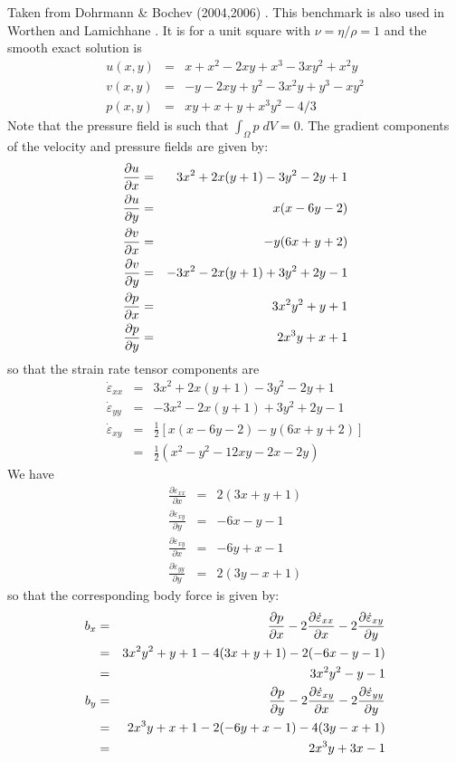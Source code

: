 Taken from Dohrmann \& Bochev (2004,2006) \cite{dobo04,bodg06}. 
This benchmark is also used in Worthen \etal \cite{wosp14} and Lamichhane \etal \cite{lami17}.
It is for a unit square with $\nu=\eta/\rho=1$ and the smooth exact solution is
\begin{eqnarray}
u(x,y) &=& x+x^2 - 2xy+x^3 - 3xy^2 + x^2y \\
v(x,y) &=& -y-2xy+y^2 -3x^2y + y^3 - xy^2 \\
p(x,y) &=& xy+x+y+x^3y^2 - 4/3
\end{eqnarray}
Note that the pressure field is such that $\int_{\Omega} p \; dV = 0$.
The gradient components of the velocity and pressure fields are given by:
\begin{eqnarray}
\frac{\partial u}{\partial x} &=& 3x^2+2x(y+1)-3y^2-2y+1  \nonumber \\
\frac{\partial u}{\partial y} &=& x(x-6y-2) \nonumber\\
\frac{\partial v}{\partial x} &=& -y(6x+y+2) \nonumber\\
\frac{\partial v}{\partial y} &=& -3x^2-2x(y+1)+3y^2+2y-1 \nonumber\\
\frac{\partial p}{\partial x} &=& 3x^2y^2 + y +1 \nonumber\\ 
\frac{\partial p}{\partial y} &=& 2x^3y+x+1 \nonumber
\end{eqnarray}
so that the strain rate tensor components are 
\begin{eqnarray}
\dot{\varepsilon}_{xx} &=&  3x^2+2x(y+1)-3y^2-2y+1 \\
\dot{\varepsilon}_{yy} &=& -3x^2-2x(y+1)+3y^2+2y-1 \\
\dot{\varepsilon}_{xy} &=&  \frac{1}{2} [x(x-6y-2) -y(6x+y+2) ] \\
&=& \frac{1}{2}( x^2 -y^2 -12xy -2x -2y)
\end{eqnarray}
We have
\begin{eqnarray}
\frac{\partial \dot{\varepsilon}_{xx}}{\partial x} &=& 2(3x+y+1) \\
\frac{\partial \dot{\varepsilon}_{xy}}{\partial y} &=& -6x-y-1  \\
\frac{\partial \dot{\varepsilon}_{xy}}{\partial x} &=&  -6y+x-1 \\  
\frac{\partial \dot{\varepsilon}_{yy}}{\partial y} &=& 2(3y-x+1) 
\end{eqnarray}
so that the corresponding body force is given by:
\begin{eqnarray}
b_x 
&=& \frac{\partial p}{\partial x}  
-2\frac{\partial \dot{\varepsilon}_{xx}}{\partial x} -  2\frac{\partial \dot{\varepsilon}_{xy}}{\partial y} \nonumber\\
&=& 3x^2y^2 + y +1  - 4(3x+y+1) - 2(-6x-y-1) \nonumber\\
&=& 3x^2y^2 -y-1   \\
b_y 
&=& \frac{\partial p}{\partial y} 
-2 \frac{\partial \dot{\varepsilon}_{xy}}{\partial x} - 2\frac{\partial \dot{\varepsilon}_{yy}}{\partial y}  \nonumber\\
&=& 2x^3y+x+1  -2(-6y+x-1) - 4(3y-x+1) \nonumber\\
&=& 2x^3y+3x-1 
\end{eqnarray}

